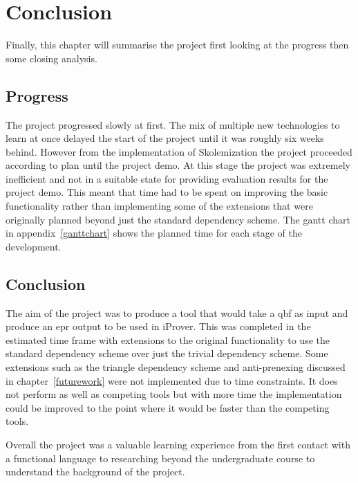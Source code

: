 \chapter{Conclusion}
Finally, this chapter will summarise the project first looking at the progress then some closing analysis.

\section{Progress}
The project progressed slowly at first. The mix of multiple new technologies to learn at once delayed the start of the project until it was roughly six weeks behind. However from the implementation of Skolemization the project proceeded according to plan until the project demo. At this stage the project was extremely inefficient and not in a suitable state for providing evaluation results for the project demo. This meant that time had to be spent on improving the basic functionality rather than implementing some of the extensions that were originally planned beyond just the standard dependency scheme. The gantt chart in appendix~\ref{ganttchart} shows the planned time for each stage of the development.

\section{Conclusion}
The aim of the project was to produce a tool that would take a \gls{qbf} as input and produce an \gls{epr} output to be used in iProver. This was completed in the estimated time frame with extensions to the original functionality to use the standard dependency scheme over just the trivial dependency scheme. Some extensions such as the triangle dependency scheme and anti-prenexing discussed in chapter~\ref{futurework} were not implemented due to time constraints. It does not perform as well as competing tools but with more time the implementation could be improved to the point where it would be faster than the competing tools.

Overall the project was a valuable learning experience from the first contact with a functional language to researching beyond the undergraduate course to understand the background of the project.
